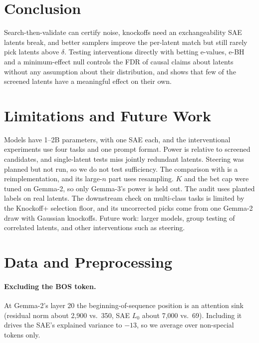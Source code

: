 \section{Conclusion}

Search-then-validate can certify noise, knockoffs need an exchangeability SAE latents break, and better samplers improve the
per-latent match but still rarely pick latents above $\delta$. Testing interventions directly with betting e-values, e-BH and a minimum-effect null
controls the FDR of causal claims about latents without any assumption about their distribution, and shows that few of the
screened latents have a meaningful effect on their own.

\section*{Limitations and Future Work}

Models have 1--2B parameters, with one SAE each, and the interventional experiments use four tasks and one prompt format. Power is
relative to screened candidates, and single-latent tests miss jointly redundant latents. Steering was planned but not run, so we do
not test sufficiency. The comparison with \citet{khera2026} is a reimplementation, and its large-$n$ part uses resampling. $K$ and
the bet cap were tuned on Gemma-2, so only Gemma-3's power is held out. The audit uses planted labels on real latents. The downstream check on multi-class tasks is limited by the Knockoff+ selection floor, and its uncorrected picks come from one Gemma-2 draw with Gaussian knockoffs. Future work:
larger models, group testing of correlated latents, and other interventions such as steering.




\appendix

\section{Data and Preprocessing}
\label{app:data}

\paragraph{Excluding the BOS token.} At Gemma-2's layer 20 the beginning-of-sequence position is an attention sink (residual
norm about 2,900 vs.\ 350, SAE $L_0$ about 7,000 vs.\ 69). Including it drives the SAE's explained variance to $-13$, so we
average over non-special tokens only.

